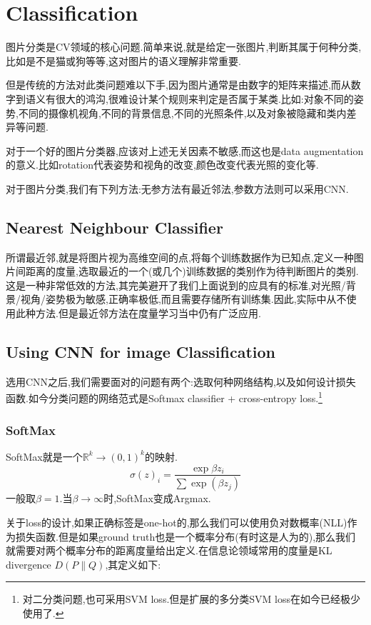 \section{Classification}

图片分类是CV领域的核心问题.简单来说,就是给定一张图片,判断其属于何种分类,比如是不是猫或狗等等,这对图片的语义理解非常重要.

但是传统的方法对此类问题难以下手,因为图片通常是由数字的矩阵来描述,而从数字到语义有很大的鸿沟,很难设计某个规则来判定是否属于某类.比如:对象不同的姿势,不同的摄像机视角,不同的背景信息,不同的光照条件,以及对象被隐藏和类内差异等问题.

对于一个好的图片分类器,应该对上述无关因素不敏感,而这也是data augmentation的意义.比如rotation代表姿势和视角的改变,颜色改变代表光照的变化等.

对于图片分类,我们有下列方法:无参方法有最近邻法,参数方法则可以采用CNN.
\subsection{Nearest Neighbour Classifier}
所谓最近邻,就是将图片视为高维空间的点,将每个训练数据作为已知点,定义一种图片间距离的度量,选取最近的一个(或几个)训练数据的类别作为待判断图片的类别.这是一种非常低效的方法,其完美避开了我们上面说到的应具有的标准,对光照/背景/视角/姿势极为敏感,正确率极低,而且需要存储所有训练集.因此,实际中从不使用此种方法.但是最近邻方法在度量学习当中仍有广泛应用.

\subsection{Using CNN for image Classification}
选用CNN之后,我们需要面对的问题有两个:选取何种网络结构,以及如何设计损失函数.如今分类问题的网络范式是Softmax classifier + cross-entropy loss.\footnote{对二分类问题,也可采用SVM loss.但是扩展的多分类SVM loss在如今已经极少使用了.}

\subsubsection{SoftMax}
SoftMax就是一个$\mathbb R^k \to (0, 1)^k$的映射.
\begin{equation}
	\sigma(z)_i = \frac{\exp{\beta z_i}}{\sum \exp(\beta z_j)}
\end{equation}
一般取$\beta = 1.$当$\beta \to \infty$时,SoftMax变成Argmax.

关于loss的设计,如果正确标签是one-hot的,那么我们可以使用负对数概率(NLL)作为损失函数.但是如果ground truth也是一个概率分布(有时这是人为的),那么我们就需要对两个概率分布的距离度量给出定义.在信息论领域常用的度量是KL divergence $D(P \parallel Q)$,其定义如下:

